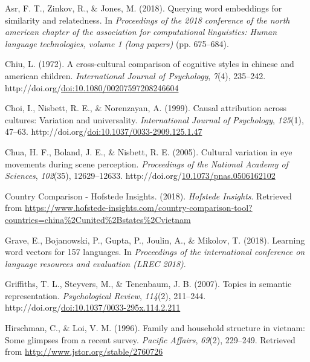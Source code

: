 \documentclass[10pt, letterpaper]{article}
\newenvironment{CSLReferences}%
  {}%
  {\par}
\begin{document}
\hypertarget{refs}{}
\begin{CSLReferences}{1}{0}
\leavevmode{}%
Asr, F. T., Zinkov, R., \& Jones, M. (2018). Querying word embeddings
for similarity and relatedness. In \emph{Proceedings of the 2018
conference of the north american chapter of the association for
computational linguistics: Human language technologies, volume 1 (long
papers)} (pp. 675--684).

\leavevmode{}%
Chiu, L. (1972). A cross-cultural comparison of cognitive styles in
chinese and american children. \emph{International Journal of
Psychology}, \emph{7}(4), 235--242.
http://doi.org/\href{https://doi.org/doi:10.1080/00207597208246604}{doi:10.1080/00207597208246604}

\leavevmode{}%
Choi, I., Nisbett, R. E., \& Norenzayan, A. (1999). Causal attribution
across cultures: Variation and universality. \emph{International Journal
of Psychology}, \emph{125}(1), 47--63.
http://doi.org/\href{https://doi.org/doi:10.1037/0033-2909.125.1.47}{doi:10.1037/0033-2909.125.1.47}

\leavevmode{}%
Chua, H. F., Boland, J. E., \& Nisbett, R. E. (2005). Cultural variation
in eye movements during scene perception. \emph{Proceedings of the
National Academy of Sciences}, \emph{102}(35), 12629--12633.
http://doi.org/\href{https://doi.org/10.1073/pnas.0506162102}{10.1073/pnas.0506162102}

\leavevmode{}%
{Country Comparison - Hofstede Insights}. (2018). \emph{Hofstede
Insights}. Retrieved from
\url{https://www.hofstede-insights.com/country-comparison-tool?countries=china\%2Cunited\%2Bstates\%2Cvietnam}

\leavevmode{}%
Grave, E., Bojanowski, P., Gupta, P., Joulin, A., \& Mikolov, T. (2018).
Learning word vectors for 157 languages. In \emph{Proceedings of the
international conference on language resources and evaluation (LREC
2018)}.

\leavevmode{}%
Griffiths, T. L., Steyvers, M., \& Tenenbaum, J. B. (2007). Topics in
semantic representation. \emph{Psychological Review}, \emph{114}(2),
211--244.
http://doi.org/\href{https://doi.org/doi:10.1037/0033-295x.114.2.211}{doi:10.1037/0033-295x.114.2.211}

\leavevmode{}%
Hirschman, C., \& Loi, V. M. (1996). Family and household structure in
vietnam: Some glimpses from a recent survey. \emph{Pacific Affairs},
\emph{69}(2), 229--249. Retrieved from
\url{http://www.jstor.org/stable/2760726}


\end{CSLReferences}
\end{document}
